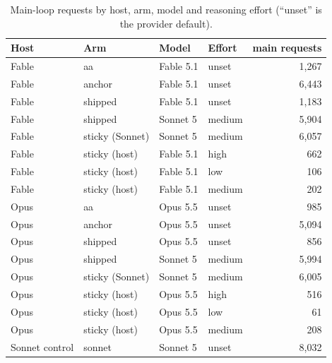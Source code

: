 \documentclass[11pt,letterpaper]{article}
\begin{document}
\begin{table}[!hb]
\centering\small
\caption{Main-loop requests by host, arm, model and reasoning effort (``unset'' is the provider default).}
\label{vt:tab:effortmix}
\begin{tabular*}{\textwidth}{@{\extracolsep{\fill}}l l l l r@{}}
\toprule
Host & Arm & Model & Effort & main requests \\
\midrule
Fable & aa & Fable 5.1 & unset & 1{,}267 \\
Fable & anchor & Fable 5.1 & unset & 6{,}443 \\
Fable & shipped & Fable 5.1 & unset & 1{,}183 \\
Fable & shipped & Sonnet 5 & medium & 5{,}904 \\
Fable & sticky (Sonnet) & Sonnet 5 & medium & 6{,}057 \\
Fable & sticky (host) & Fable 5.1 & high & 662 \\
Fable & sticky (host) & Fable 5.1 & low & 106 \\
Fable & sticky (host) & Fable 5.1 & medium & 202 \\
Opus & aa & Opus 5.5 & unset & 985 \\
Opus & anchor & Opus 5.5 & unset & 5{,}094 \\
Opus & shipped & Opus 5.5 & unset & 856 \\
Opus & shipped & Sonnet 5 & medium & 5{,}994 \\
Opus & sticky (Sonnet) & Sonnet 5 & medium & 6{,}005 \\
Opus & sticky (host) & Opus 5.5 & high & 516 \\
Opus & sticky (host) & Opus 5.5 & low & 61 \\
Opus & sticky (host) & Opus 5.5 & medium & 208 \\
Sonnet control & sonnet & Sonnet 5 & unset & 8{,}032 \\
\bottomrule
\end{tabular*}
 \end{table}
\end{document}
